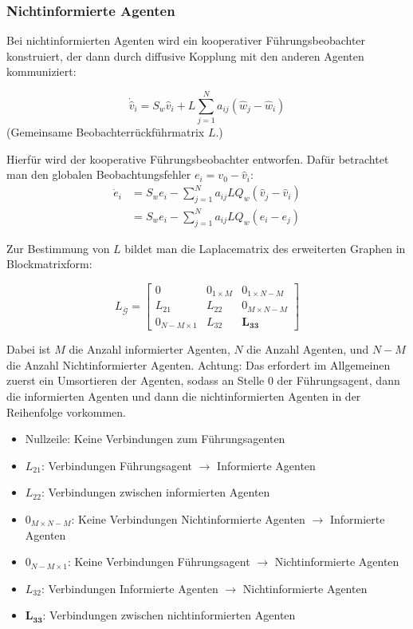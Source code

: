 \subsubsection{Nichtinformierte Agenten}

Bei nichtinformierten Agenten wird ein kooperativer Führungsbeobachter konstruiert,
der dann durch diffusive Kopplung mit den anderen Agenten kommuniziert:

\begin{equation}
    \dot{\hat{v}}_i = S_w \hat{v}_i + L \sum_{j=1}^N a_{ij} (\hat{w}_j - \hat{w}_i)
\end{equation}
(Gemeinsame Beobachterrückführmatrix $L$.)

Hierfür wird der kooperative Führungsbeobachter entworfen.
Dafür betrachtet man den globalen Beobachtungsfehler $e_i = v_0 - \hat{v}_i$:
\begin{align}
    \dot{e}_i &= S_w e_i - \sum_{j=1}^N a_{ij} L Q_w (\hat{v}_j - \hat{v}_i) \\
    &= S_w e_i - \sum_{j=1}^N a_{ij} L Q_w (e_i - e_j)
\end{align}

Zur Bestimmung von $L$ bildet man die Laplacematrix des erweiterten Graphen in Blockmatrixform:

\begin{equation}
    L_{\overbar{\mathcal{G}}} = \begin{bmatrix}
        0 & 0_{1\times M} & 0_{1 \times N-M}\\
        L_{21} & L_{22} & 0_{M \times N-M} \\
        0_{N-M \times 1} & L_{32} & \bm{L_{33}}
    \end{bmatrix}
\end{equation}

Dabei ist $M$ die Anzahl informierter Agenten, $N$ die Anzahl Agenten, und $N-M$ die
Anzahl Nichtinformierter Agenten.
Achtung: Das erfordert im Allgemeinen zuerst ein Umsortieren der Agenten, sodass
an Stelle 0 der Führungsagent, dann die informierten Agenten und dann die
nichtinformierten Agenten in der Reihenfolge vorkommen.

\begin{itemize}
    \item Nullzeile: Keine Verbindungen zum Führungsagenten
    \item $L_{21}$: Verbindungen Führungsagent $\rightarrow$ Informierte Agenten
    \item $L_{22}$: Verbindungen zwischen informierten Agenten
    \item $0_{M \times N-M}$: Keine Verbindungen Nichtinformierte Agenten $\rightarrow$ Informierte Agenten 
    \item $0_{N-M \times 1}$: Keine Verbindungen Führungsagent $\rightarrow$ Nichtinformierte Agenten
    \item $L_{32}$: Verbindungen Informierte Agenten $\rightarrow$ Nichtinformierte Agenten
    \item $\bm{L_{33}}$: Verbindungen zwischen nichtinformierten Agenten
\end{itemize}

